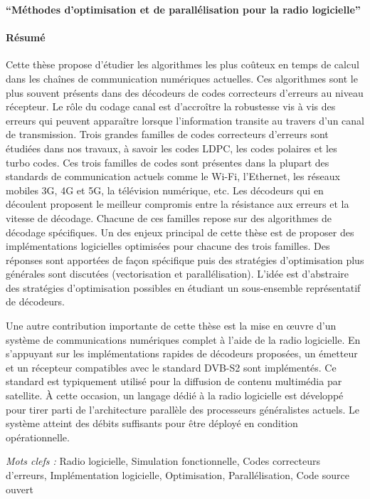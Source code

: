 \documentclass[a4paper, 11pt]{article}
\begin{document}
\thispagestyle{empty}

\noindent
{\large \textbf{``Méthodes d'optimisation et de parallélisation pour la radio
                logicielle''}}

\paragraph{Résumé}

Cette thèse propose d'étudier les algorithmes les plus coûteux en temps de
calcul dans les chaînes de communication numériques actuelles. Ces algorithmes
sont le plus souvent présents dans des décodeurs de codes correcteurs d'erreurs
au niveau récepteur. Le rôle du codage canal est d'accroître la robustesse vis à
vis des erreurs qui peuvent apparaître lorsque l'information transite au travers
d'un canal de transmission. Trois grandes familles de codes correcteurs
d'erreurs sont étudiées dans nos travaux, à savoir les codes LDPC, les codes
polaires et les turbo codes. Ces trois familles de codes sont présentes dans la
plupart des standards de communication actuels comme le Wi-Fi, l'Ethernet, les
réseaux mobiles 3G, 4G et 5G, la télévision numérique, etc. Les décodeurs qui en
découlent proposent le meilleur compromis entre la résistance aux erreurs et la
vitesse de décodage. Chacune de ces familles repose sur des algorithmes de
décodage spécifiques. Un des enjeux principal de cette thèse est de proposer des
implémentations logicielles optimisées pour chacune des trois familles. Des
réponses sont apportées de façon spécifique puis des stratégies d'optimisation
plus générales sont discutées (vectorisation et parallélisation). L'idée est
d'abstraire des stratégies d'optimisation possibles en étudiant un sous-ensemble
représentatif de décodeurs.

Une autre contribution importante de cette thèse est la mise en œuvre d'un
système de communications numériques complet à l'aide de la radio logicielle. En
s'appuyant sur les implémentations rapides de décodeurs proposées, un émetteur
et un récepteur compatibles avec le standard DVB-S2 sont implémentés. Ce
standard est typiquement utilisé pour la diffusion de contenu multimédia par
satellite. À cette occasion, un langage dédié à la radio logicielle est
développé pour tirer parti de l'architecture parallèle des processeurs
généralistes actuels. Le système atteint des débits suffisants pour être déployé
en condition opérationnelle.

\vskip0.5cm
\emph{Mots clefs :} Radio logicielle, Simulation fonctionnelle, Codes
                    correcteurs d'erreurs, Implémentation logicielle,
                    Optimisation, Parallélisation, Code source ouvert
\end{document}
